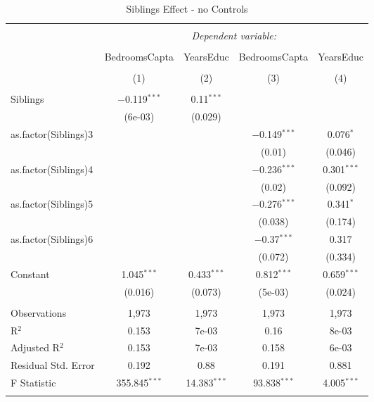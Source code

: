 
\begin{table}[H] \centering 
  \caption{Siblings Effect - no Controls} 
  \label{} 
\begin{tabular}{@{\extracolsep{5pt}}lcccc} 
\\[-1.8ex]\hline 
\hline \\[-1.8ex] 
 & \multicolumn{4}{c}{\textit{Dependent variable:}} \\ 
\cline{2-5} 
\\[-1.8ex] & BedroomsCapta & YearsEduc & BedroomsCapta & YearsEduc \\ 
\\[-1.8ex] & (1) & (2) & (3) & (4)\\ 
\hline \\[-1.8ex] 
 Siblings & $-$0.119$^{***}$ & 0.11$^{***}$ &  &  \\ 
  & (6e-03) & (0.029) &  &  \\ 
  as.factor(Siblings)3 &  &  & $-$0.149$^{***}$ & 0.076$^{*}$ \\ 
  &  &  & (0.01) & (0.046) \\ 
  as.factor(Siblings)4 &  &  & $-$0.236$^{***}$ & 0.301$^{***}$ \\ 
  &  &  & (0.02) & (0.092) \\ 
  as.factor(Siblings)5 &  &  & $-$0.276$^{***}$ & 0.341$^{*}$ \\ 
  &  &  & (0.038) & (0.174) \\ 
  as.factor(Siblings)6 &  &  & $-$0.37$^{***}$ & 0.317 \\ 
  &  &  & (0.072) & (0.334) \\ 
  Constant & 1.045$^{***}$ & 0.433$^{***}$ & 0.812$^{***}$ & 0.659$^{***}$ \\ 
  & (0.016) & (0.073) & (5e-03) & (0.024) \\ 
 \hline \\[-1.8ex] 
Observations & 1,973 & 1,973 & 1,973 & 1,973 \\ 
R$^{2}$ & 0.153 & 7e-03 & 0.16 & 8e-03 \\ 
Adjusted R$^{2}$ & 0.153 & 7e-03 & 0.158 & 6e-03 \\ 
Residual Std. Error & 0.192 & 0.88 & 0.191 & 0.881 \\ 
F Statistic & 355.845$^{***}$ & 14.383$^{***}$ & 93.838$^{***}$ & 4.005$^{***}$ \\ 
\hline 
\hline \\[-1.8ex] 
\end{tabular} 
\end{table} 
